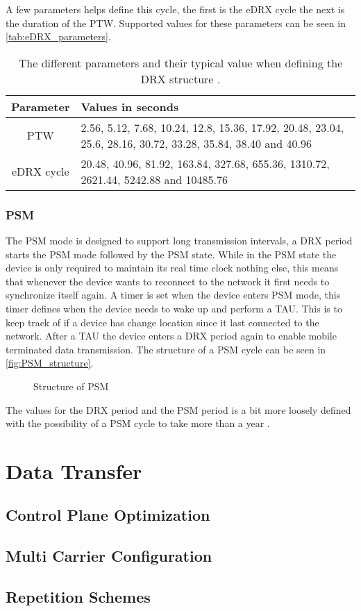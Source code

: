 A few parameters helps define this cycle, the first is the eDRX cycle the next is the duration of the \gls{PTW}. Supported values for these parameters can be seen in \autoref{tab:eDRX_parameters}.

\begin{table}[H]
\centering
\begin{tabular}{|c|p{8cm}|} \hline
\textbf{Parameter} & \textbf{Values in seconds} \\ \hline 
PTW & 2.56, 5.12, 7.68, 10.24, 12.8, 15.36, 17.92, 20.48, 23.04, 25.6, 28.16, 30.72, 33.28, 35.84, 38.40 and 40.96\\ \hline
eDRX cycle & 20.48, 40.96, 81.92, 163.84, 327.68, 655.36, 1310.72, 2621.44, 5242.88 and 10485.76 \\ \hline
\end{tabular}
\caption{The different parameters and their typical value when defining the DRX structure \citep{book_LTE_for_UMTS}.}
\label{tab:eDRX_parameters}
\end{table}

\subsubsection{PSM}
The PSM mode is designed to support long transmission intervals, a DRX period starts the PSM mode followed by the PSM state. While in the PSM state the device is only required to maintain its real time clock nothing else, this means that whenever the device wants to reconnect to the network it first needs to synchronize itself again. A timer is set when the device enters PSM mode, this timer defines when the device needs to wake up and perform a \gls{TAU}. This is to keep track of if a device has change location since it last connected to the network. After a TAU the device enters a DRX period again to enable mobile terminated data transmission. The structure of a PSM cycle can be seen in \autoref{fig:PSM_structure}.

\begin{figure}[H]
\centering
%
\caption{Structure of \gls{PSM}}
\label{fig:PSM_structure}
\end{figure}

The values for the DRX period and the PSM period is a bit more loosely defined with the possibility of a PSM cycle to take more than a year \citep{NB-IoT_Book}.

\section{Data Transfer}

\subsection{Control Plane Optimization}

\subsection{Multi Carrier Configuration}

\subsection{Repetition Schemes}

